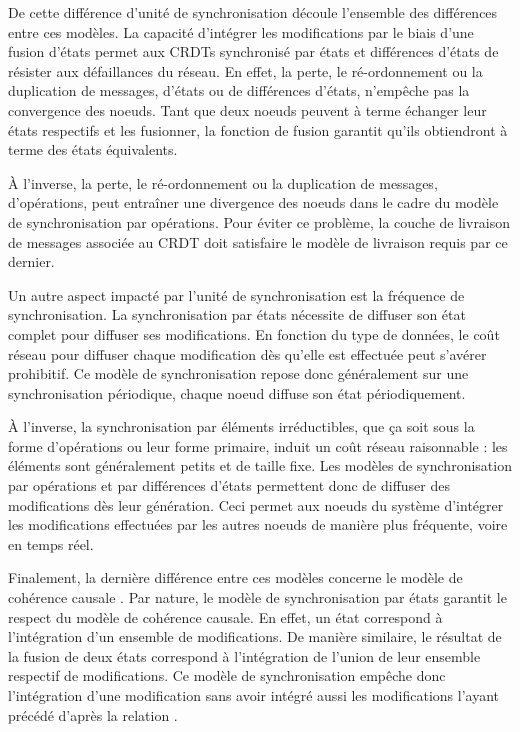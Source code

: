 De cette différence d'unité de synchronisation découle l'ensemble des différences entre ces modèles.
La capacité d'intégrer les modifications par le biais d'une fusion d'états permet aux \acp{CRDT} synchronisé par états et différences d'états de résister aux défaillances du réseau.
En effet, la perte, le ré-ordonnement ou la duplication de messages, \ie d'états ou de différences d'états, n'empêche pas la convergence des noeuds.
Tant que deux noeuds peuvent à terme échanger leur états respectifs et les fusionner, la fonction de fusion garantit qu'ils obtiendront à terme des états équivalents.

À l'inverse, la perte, le ré-ordonnement ou la duplication de messages, \ie d'opérations, peut entraîner une divergence des noeuds dans le cadre du modèle de synchronisation par opérations.
Pour éviter ce problème, la couche de livraison de messages associée au \ac{CRDT} doit satisfaire le modèle de livraison requis par ce dernier.

Un autre aspect impacté par l'unité de synchronisation est la fréquence de synchronisation.
La synchronisation par états nécessite de diffuser son état complet pour diffuser ses modifications.
En fonction du type de données, le coût réseau pour diffuser chaque modification dès qu'elle est effectuée peut s'avérer prohibitif.
Ce modèle de synchronisation repose donc généralement sur une synchronisation périodique, \ie chaque noeud diffuse son état périodiquement.

À l'inverse, la synchronisation par éléments irréductibles, que ça soit sous la forme d'opérations ou leur forme primaire, induit un coût réseau raisonnable : les éléments sont généralement petits et de taille fixe.
Les modèles de synchronisation par opérations et par différences d'états permettent donc de diffuser des modifications dès leur génération.
Ceci permet aux noeuds du système d'intégrer les modifications effectuées par les autres noeuds de manière plus fréquente, voire en temps réel.

Finalement, la dernière différence entre ces modèles concerne le modèle de cohérence causale .
Par nature, le modèle de synchronisation par états garantit le respect du modèle de cohérence causale.
En effet, un état correspond à l'intégration d'un ensemble de modifications.
De manière similaire, le résultat de la fusion de deux états correspond à l'intégration de l'union de leur ensemble respectif de modifications.
Ce modèle de synchronisation empêche donc l'intégration d'une modification sans avoir intégré aussi les modifications l'ayant précédé d'après la relation \hb.

